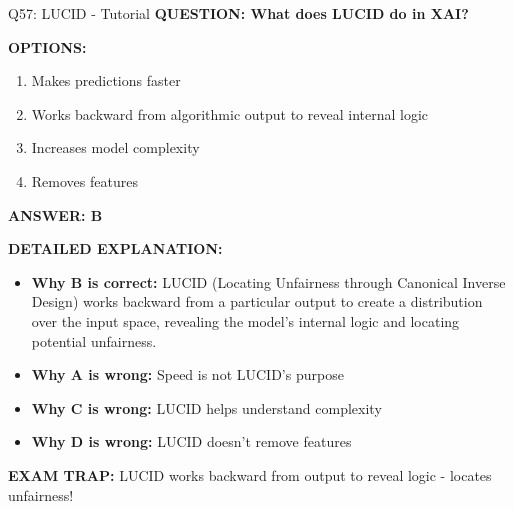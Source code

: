 \documentclass[8pt]{beamer}
\begin{document}
	\begin{frame}{Q57: LUCID - Tutorial}
		\fontsize{6.5}{7.5}\selectfont
		\textbf{QUESTION: What does LUCID do in XAI?}
		
		\vspace{0.1cm}
		\textbf{OPTIONS:}
		\begin{enumerate}
			\item Makes predictions faster
			\item Works backward from algorithmic output to reveal internal logic
			\item Increases model complexity
			\item Removes features
		\end{enumerate}
		
		\vspace{0.1cm}
		\textcolor{myblue}{\textbf{ANSWER: B}}
		
		\vspace{0.1cm}
		\textbf{DETAILED EXPLANATION:}
		\begin{itemize}
			\item \textbf{Why B is correct:} LUCID (Locating Unfairness through Canonical Inverse Design) works backward from a particular output to create a distribution over the input space, revealing the model's internal logic and locating potential unfairness.
			\item \textbf{Why A is wrong:} Speed is not LUCID's purpose
			\item \textbf{Why C is wrong:} LUCID helps understand complexity
			\item \textbf{Why D is wrong:} LUCID doesn't remove features
		\end{itemize}
		
		\textcolor{myred}{\textbf{EXAM TRAP:}} LUCID works \textcolor{myblue}{backward from output to reveal logic} - locates unfairness!
	\end{frame}
	
\end{document}
